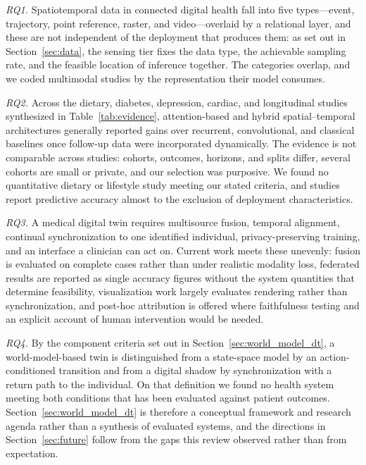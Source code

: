 \documentclass[journal]{IEEEtran}
\begin{document}
\emph{RQ1.} Spatiotemporal data in connected digital health fall into five types---event, trajectory, point reference, raster, and video---overlaid by a relational layer, and these are not independent of the deployment that produces them: as set out in Section~\ref{sec:data}, the sensing tier fixes the data type, the achievable sampling rate, and the feasible location of inference together. The categories overlap, and we coded multimodal studies by the representation their model consumes.

\emph{RQ2.} Across the dietary, diabetes, depression, cardiac, and longitudinal studies synthesized in Table~\ref{tab:evidence}, attention-based and hybrid spatial--temporal architectures generally reported gains over recurrent, convolutional, and classical baselines once follow-up data were incorporated dynamically. The evidence is not comparable across studies: cohorts, outcomes, horizons, and splits differ, several cohorts are small or private, and our selection was purposive. We found no quantitative dietary or lifestyle study meeting our stated criteria, and studies report predictive accuracy almost to the exclusion of deployment characteristics.

\emph{RQ3.} A medical digital twin requires multisource fusion, temporal alignment, continual synchronization to one identified individual, privacy-preserving training, and an interface a clinician can act on. Current work meets these unevenly: fusion is evaluated on complete cases rather than under realistic modality loss, federated results are reported as single accuracy figures without the system quantities that determine feasibility, visualization work largely evaluates rendering rather than synchronization, and post-hoc attribution is offered where faithfulness testing and an explicit account of human intervention would be needed.

\emph{RQ4.} By the component criteria set out in Section~\ref{sec:world_model_dt}, a world-model-based twin is distinguished from a state-space model by an action-conditioned transition and from a digital shadow by synchronization with a return path to the individual. On that definition we found no health system meeting both conditions that has been evaluated against patient outcomes. Section~\ref{sec:world_model_dt} is therefore a conceptual framework and research agenda rather than a synthesis of evaluated systems, and the directions in Section~\ref{sec:future} follow from the gaps this review observed rather than from expectation.
\end{document}
